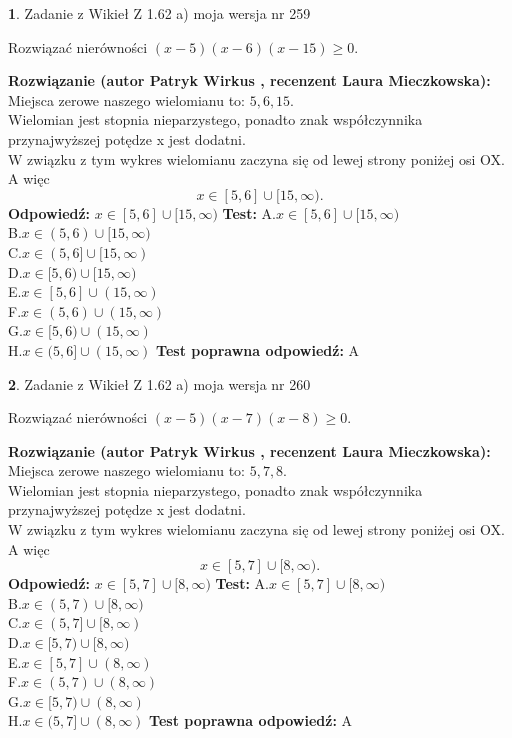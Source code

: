 \documentclass[12pt, a4paper]{article}
\theoremstyle{definition} %
\newtheorem{zad}{}
\newcommand{\zadStart}[1]{\begin{zad}#1\newline}
\newcommand{\zadStop}{\end{zad}}
\newcommand{\rozwStart}[2]{\noindent \textbf{Rozwiązanie (autor #1 , recenzent #2): }\newline}
\newcommand{\rozwStop}{\newline}
\newcommand{\odpStart}{\noindent \textbf{Odpowiedź:}\newline}
\newcommand{\odpStop}{\newline}
\newcommand{\testStart}{\noindent \textbf{Test:}\newline}
\newcommand{\testStop}{\newline}
\newcommand{\kluczStart}{\noindent \textbf{Test poprawna odpowiedź:}\newline}
\newcommand{\kluczStop}{\newline}
\begin{document}
\zadStart{Zadanie z Wikieł Z 1.62 a) moja wersja nr 259}

Rozwiązać nierówności $(x-5)(x-6)(x-15)\ge0$.
\zadStop
\rozwStart{Patryk Wirkus}{Laura Mieczkowska}
Miejsca zerowe naszego wielomianu to: $5, 6, 15$.\\
Wielomian jest stopnia nieparzystego, ponadto znak współczynnika przy\linebreak najwyższej potędze x jest dodatni.\\ W związku z tym wykres wielomianu zaczyna się od lewej strony poniżej osi OX. A więc $$x \in [5,6] \cup [15,\infty).$$
\rozwStop
\odpStart
$x \in [5,6] \cup [15,\infty)$
\odpStop
\testStart
A.$x \in [5,6] \cup [15,\infty)$\\
B.$x \in (5,6) \cup [15,\infty)$\\
C.$x \in (5,6] \cup [15,\infty)$\\
D.$x \in [5,6) \cup [15,\infty)$\\
E.$x \in [5,6] \cup (15,\infty)$\\
F.$x \in (5,6) \cup (15,\infty)$\\
G.$x \in [5,6) \cup (15,\infty)$\\
H.$x \in (5,6] \cup (15,\infty)$
\testStop
\kluczStart
A
\kluczStop



\zadStart{Zadanie z Wikieł Z 1.62 a) moja wersja nr 260}

Rozwiązać nierówności $(x-5)(x-7)(x-8)\ge0$.
\zadStop
\rozwStart{Patryk Wirkus}{Laura Mieczkowska}
Miejsca zerowe naszego wielomianu to: $5, 7, 8$.\\
Wielomian jest stopnia nieparzystego, ponadto znak współczynnika przy\linebreak najwyższej potędze x jest dodatni.\\ W związku z tym wykres wielomianu zaczyna się od lewej strony poniżej osi OX. A więc $$x \in [5,7] \cup [8,\infty).$$
\rozwStop
\odpStart
$x \in [5,7] \cup [8,\infty)$
\odpStop
\testStart
A.$x \in [5,7] \cup [8,\infty)$\\
B.$x \in (5,7) \cup [8,\infty)$\\
C.$x \in (5,7] \cup [8,\infty)$\\
D.$x \in [5,7) \cup [8,\infty)$\\
E.$x \in [5,7] \cup (8,\infty)$\\
F.$x \in (5,7) \cup (8,\infty)$\\
G.$x \in [5,7) \cup (8,\infty)$\\
H.$x \in (5,7] \cup (8,\infty)$
\testStop
\kluczStart
A
\kluczStop
\end{document}
